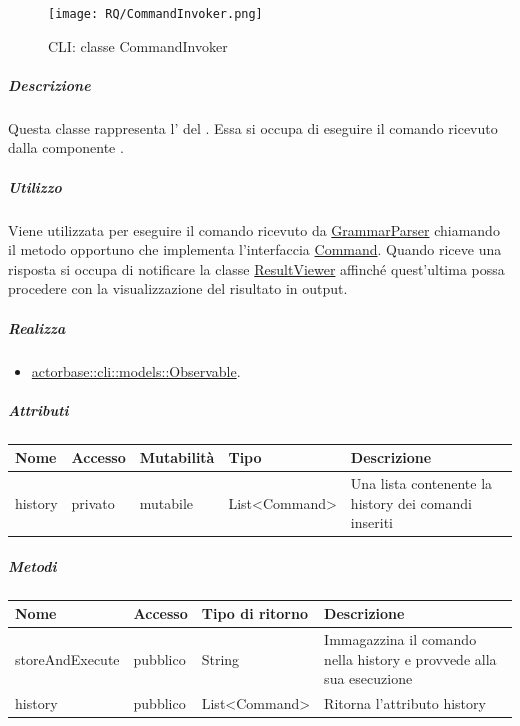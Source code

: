 \documentclass{scalatekids-article}
\begin{document}
\begin{figure}[H]
  \begin{center}
    \texttt{[image: RQ/CommandInvoker.png]}
    \caption{CLI: classe CommandInvoker}
  \end{center}
\end{figure}

\subparagraph{Descrizione}

Questa classe rappresenta l' del . Essa
si occupa di eseguire il comando ricevuto dalla componente .

\subparagraph{Utilizzo}

Viene utilizzata per eseguire il comando ricevuto da
\hyperref[sec:actorbase::cli::controllers::GrammarParser]{GrammarParser} chiamando il metodo opportuno che
implementa l'interfaccia \hyperref[sec:actorbase::cli::models::Command]{Command}.
Quando riceve una risposta si occupa di notificare la classe \hyperref[sec:actorbase::cli::views::ResultViewer]{ResultViewer}
affinché quest'ultima possa procedere con la visualizzazione del risultato in output.

\subparagraph{Realizza}

\begin{itemize}
\item \hyperref[sec:actorbase::cli::models::Observable]{actorbase::cli::models::Observable}.
\end{itemize}

\subparagraph{Attributi}

\begin{tabular}{| p{2.5cm} | p{1.5cm} | p{2cm} | p{2.5cm} | p{8.5cm} |}
  \hline
  Nome & Accesso & Mutabilità & Tipo & Descrizione\\
  \hline
  history & privato & mutabile & List<Command> & Una lista contenente la history dei comandi inseriti\\
  \hline
\end{tabular}

\subparagraph{Metodi}

\begin{tabular}{| p{3cm} | p{1.5cm} | p{3.5cm} | p{9cm} |}
  \hline
  Nome & Accesso & Tipo di ritorno & Descrizione\\
  \hline
  storeAndExecute & pubblico & String & Immagazzina il comando nella history e provvede alla sua esecuzione\\
  \hline
  history & pubblico & List<Command> & Ritorna l'attributo history\\
  \hline
\end{tabular}
\end{document}
